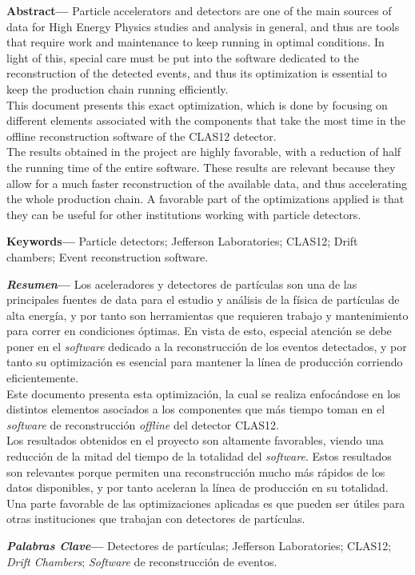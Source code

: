 \noindent \textbf{Abstract---}
Particle accelerators and detectors are one of the main sources of data for High Energy Physics studies and analysis in general, and thus are tools that require work and maintenance to keep running in optimal conditions.
In light of this, special care must be put into the software dedicated to the reconstruction of the detected events, and thus its optimization is essential to keep the production chain running efficiently. \\
This document presents this exact optimization, which is done by focusing on different elements associated with the components that take the most time in the offline reconstruction software of the CLAS12 detector. \\
The results obtained in the project are highly favorable, with a reduction of half the running time of the entire software.
These results are relevant because they allow for a much faster reconstruction of the available data, and thus accelerating the whole production chain.
A favorable part of the optimizations applied is that they can be useful for other institutions working with particle detectors.

\noindent \textbf{Keywords---} Particle detectors; Jefferson Laboratories; CLAS12; Drift chambers; Event reconstruction software.

\vspace{1.0cm}

\noindent \textbf{\emph{Resumen}---}
Los aceleradores y detectores de part\'iculas son una de las principales fuentes de data para el estudio y an\'alisis de la f\'isica de part\'iculas de alta energ\'ia, y por tanto son herramientas que requieren trabajo y mantenimiento para correr en condiciones \'optimas.
En vista de esto, especial atenci\'on se debe poner en el \textit{software} dedicado a la reconstrucci\'on de los eventos detectados, y por tanto su optimizaci\'on es esencial para mantener la l\'inea de producci\'on corriendo eficientemente.\\
Este documento presenta esta optimizaci\'on, la cual se realiza enfoc\'andose en los distintos elementos asociados a los componentes que m\'as tiempo toman en el \textit{software} de reconstrucci\'on \textit{offline} del detector CLAS12. \\
Los resultados obtenidos en el proyecto son altamente favorables, viendo una reducci\'on de la mitad del tiempo de la totalidad del \textit{software}.
Estos resultados son relevantes porque permiten una reconstrucci\'on mucho m\'as r\'apidos de los datos disponibles, y por tanto aceleran la l\'inea de producci\'on en su totalidad.
Una parte favorable de las optimizaciones aplicadas es que pueden ser \'utiles para otras instituciones que trabajan con detectores de part\'iculas.

\noindent \textbf{\emph{Palabras Clave}---} Detectores de part\'iculas; Jefferson Laboratories; CLAS12; \textit{Drift Chambers}; \textit{Software} de reconstrucci\'on de eventos.